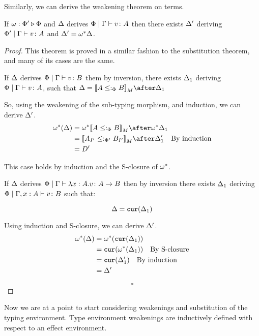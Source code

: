\documentclass{Report}
\begin{document}
Similarly, we can derive the weakening theorem on terms. 
\begin{theorem}
    If $\omega : \Phi' \triangleright \Phi$ and $\Delta$ derives $\Phi\mid\Gamma \vdash v \colon A$ then there exists $\Delta'$ deriving $\Phi'\mid\Gamma \vdash v \colon A$ and $\Delta' = \omega^*\Delta$.
\end{theorem}

\begin{proof}
    This theorem is proved in a similar fashion to the substitution theorem, and many of its cases are the same.


    If $\Delta$ derives $\Phi\mid\Gamma \vdash v \colon B$ them by inversion, there exists $\Delta_1$ deriving $\Phi\mid\Gamma \vdash v \colon A$, such that $ \D = \deno{A\subtypep B}\after \D_1$

    
    So, using the weakening of the sub-typing morphism, and induction, we can derive $\Delta'$.
    \begin{align}
        \w\star(\D) & = \w\star{\deno{A\subtypep B}}\after\w\star\D_1 \\
        & = \deno{A_{I'}\subtypepp B_{I'}}\after\D_1'\qt{By induction}\\
        & = D'
    \end{align}
    
    This case holds by induction and the S-closure of $\omega^*$.

    If $\Delta$ derives $\Phi\mid\Gamma \vdash \lambda x : A. v \colon A\rightarrow B$ then by inversion there exists $\Delta_1$ deriving $\Phi\mid\Gamma, x: A \vdash v \colon B$ such that:
    
    \begin{equation}
        \Delta = \texttt{cur}(\Delta_1)\\
    \end{equation}
    
    Using induction and S-closure, we can derive $\Delta'$.
    \begin{align}
        \omega^*(\Delta) & = \omega^*(\texttt{cur}(\Delta_1))\\
        & = \texttt{cur}(\omega^*(\Delta_1))\quad\text{By S-closure}\\
        & = \texttt{cur}(\Delta_1')\quad\text{By induction}\\
        & = \Delta'
    \end{align}

    $$\square$$

\end{proof}




Now we are at a point to start considering weakenings and substitution of the typing environment. Type environment weakenings are inductively defined with respect to an effect environment.
\end{document}
